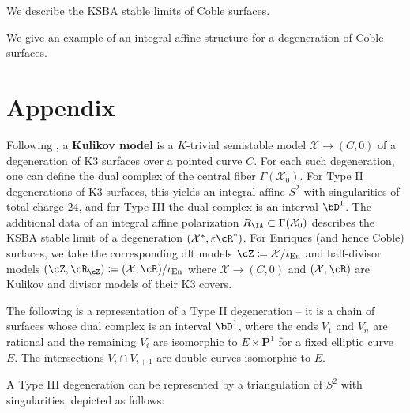 \documentclass{amsart}
\begin{document}
\begin{remark}

We describe the KSBA stable limits of Coble surfaces.

\end{remark}

\begin{remark}

We give an example of an integral affine structure for a degeneration of Coble surfaces.

\end{remark}

\section{Appendix}\label{appendix}

\begin{remark}

Following \cite{AEGS23}, a \textbf{Kulikov model} is a \(K\)-trivial semistable model \({\mathcal{X}}\to (C, 0)\) of a degeneration of K3 surfaces over a pointed curve \(C\). For each such degeneration, one can define the dual complex of the central fiber \(\Gamma({\mathcal{X}}_0)\). For Type II degenerations of K3 surfaces, this yields an integral affine \(S^2\) with singularities of total charge \(24\), and for Type III the dual complex is an interval \(\bD^1\). The additional data of an integral affine polarization \(R_{\IA} \subset \Gamma({\mathcal{X}}_0)\) describes the KSBA stable limit of a degeneration \(({\mathcal{X}}^*, \varepsilon \cR^*)\). For Enriques (and hence Coble) surfaces, we take the corresponding dlt models \(\cZ \coloneqq{\mathcal{X}}/\iota_{\operatorname{En}}\) and half-divisor models \((\cZ, \cR_{\cZ}) \coloneqq({\mathcal{X}}, \cR)/\iota_{\operatorname{En}}\) where \({\mathcal{X}}\to (C, 0)\) and \(({\mathcal{X}}, \cR)\) are Kulikov and divisor models of their K3 covers.

\end{remark}

\begin{remark}

The following is a representation of a Type II degeneration -- it is a chain of surfaces whose dual complex is an interval \(\bD^1\), where the ends \(V_1\) and \(V_n\) are rational and the remaining \(V_i\) are isomorphic to \(E\times {\mathbf{P}}^1\) for a fixed elliptic curve \(E\). The intersections \(V_i \cap V_{i+1}\) are double curves isomorphic to \(E\).

\begin{figure}[H]
\centering

\caption{}
\label{fig:typeiikdg}
\end{figure}

A Type III degeneration can be represented by a triangulation of \(S^2\) with singularities, depicted as follows:

\begin{figure}[H]
\centering

\caption{}
\label{fig:triangulated-sphere-fan}
\end{figure}

\end{remark}
\end{document}

